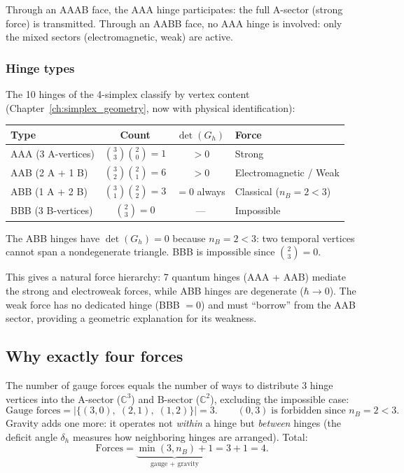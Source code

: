 \documentclass[12pt]{article}
\theoremstyle{remark}
\theoremstyle{definition}
\newcommand{\CC}{\mathbb{C}}
\begin{document}
Through an AAAB face, the AAA hinge participates: the full A-sector (strong force) is transmitted. Through an AABB face, no AAA hinge is involved: only the mixed sectors (electromagnetic, weak) are active.

\subsubsection{Hinge types}

The 10 hinges of the 4-simplex classify by vertex content (Chapter~\ref{ch:simplex_geometry}, now with physical identification):

\begin{center}
\begin{tabular}{lccl}
\hline
Type & Count & $\det(G_h)$ & Force \\
\hline
AAA (3 A-vertices) & $\binom{3}{3}\binom{2}{0} = 1$ & $> 0$ & Strong \\
AAB (2 A + 1 B) & $\binom{3}{2}\binom{2}{1} = 6$ & $> 0$ & Electromagnetic / Weak \\
ABB (1 A + 2 B) & $\binom{3}{1}\binom{2}{2} = 3$ & $= 0$ always & Classical ($n_B = 2 < 3$) \\
BBB (3 B-vertices) & $\binom{2}{3} = 0$ & --- & Impossible \\
\hline
\end{tabular}
\end{center}

The ABB hinges have $\det(G_h) = 0$ because $n_B = 2 < 3$: two temporal vertices cannot span a nondegenerate triangle. BBB is impossible since $\binom{2}{3} = 0$.

This gives a natural force hierarchy: 7 quantum hinges (AAA + AAB) mediate the strong and electroweak forces, while ABB hinges are degenerate ($\hbar \to 0$). The weak force has no dedicated hinge (BBB $= 0$) and must ``borrow'' from the AAB sector, providing a geometric explanation for its weakness.

\subsection{Why exactly four forces}

The number of gauge forces equals the number of ways to distribute 3 hinge vertices into the A-sector ($\CC^3$) and B-sector ($\CC^2$), excluding the impossible case:
\begin{equation}
\text{Gauge forces} = |\{(3,0),\;(2,1),\;(1,2)\}| = 3. \qquad (0,3)\;\text{is forbidden since } n_B = 2 < 3.
\end{equation}
Gravity adds one more: it operates not \emph{within} a hinge but \emph{between} hinges (the deficit angle $\delta_h$ measures how neighboring hinges are arranged). Total:
\begin{equation}
\text{Forces} = \underbrace{\min(3, n_B) + 1}_{\text{gauge + gravity}} = 3 + 1 = 4.
\end{equation}
\end{document}
